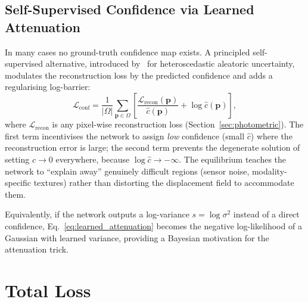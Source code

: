 \subsection{Self-Supervised Confidence via Learned Attenuation}
\label{ssec:learned_attenuation}

In many cases no ground-truth confidence map exists.  A principled
self-supervised alternative, introduced by~\citet{kendall2017uncertainties}
for heteroscedastic aleatoric uncertainty, modulates the reconstruction loss
by the predicted confidence and adds a regularising log-barrier:
%
\begin{equation}
  \mathcal{L}_{\text{conf}}
  = \frac{1}{|\Omega|}\sum_{\mathbf{p}\in\Omega}\left[
      \frac{\mathcal{L}_{\text{recon}}(\mathbf{p})}{\hat{c}(\mathbf{p})}
    + \log \hat{c}(\mathbf{p})
  \right],
  \label{eq:learned_attenuation}
\end{equation}
%
where $\mathcal{L}_{\text{recon}}$ is any pixel-wise reconstruction loss
(Section~\ref{sec:photometric}).  The first term incentivises the network to
assign \emph{low} confidence (small $\hat{c}$) where the reconstruction error
is large; the second term prevents the degenerate solution of setting
$\hat{c} \to 0$ everywhere, because $\log \hat{c} \to -\infty$.  The
equilibrium teaches the network to ``explain away'' genuinely difficult
regions (sensor noise, modality-specific textures) rather than distorting the
displacement field to accommodate them.

Equivalently, if the network outputs a log-variance $s = \log\sigma^{2}$
instead of a direct confidence, Eq.~\eqref{eq:learned_attenuation} becomes
the negative log-likelihood of a Gaussian with learned variance, providing a
Bayesian motivation for the attenuation trick.


\section{Total Loss}
\label{sec:total_loss}

